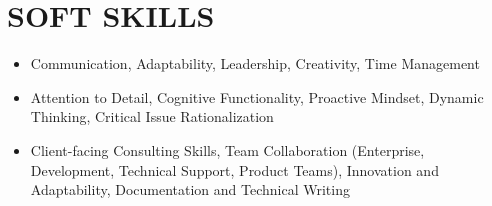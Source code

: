 \documentclass[a4paper,12pt]{article}
\begin{document}
\section*{SOFT SKILLS}
\begin{itemize}[label=-]
        \item Communication, Adaptability, Leadership, Creativity, Time Management
        \item Attention to Detail, Cognitive Functionality, Proactive Mindset, Dynamic Thinking, Critical Issue Rationalization
        \item Client-facing Consulting Skills, Team Collaboration (Enterprise, Development, Technical Support, Product Teams), Innovation and Adaptability, Documentation and Technical Writing
\end{itemize}
\end{document}

